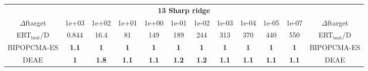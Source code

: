 \begin{tabular}{cccccccccccc}
 & \multicolumn{10}{c}{{\normalsize \textbf{13 Sharp ridge}}}\\
$\Delta$ftarget& 1e+03& 1e+02& 1e+01& 1e+00& 1e-01& 1e-02& 1e-03& 1e-04& 1e-05& 1e-07 & $\Delta$ftarget \\
ERT$_{\textrm{best}}$/D& 0.844& 16.4& 81& 149& 189& 244& 313& 370& 440& 550 & ERT$_{\textrm{best}}$/D \\
\hline
BIPOPCMA-ES & \textbf{1.1} & \textbf{1} & \textbf{1} & \textbf{1} & \textbf{1} & \textbf{1} & \textbf{1} & \textbf{1} & \textbf{1} & \textbf{1} & BIPOPCMA-ES \cite{add_an_entry_for_BIPOPCMA-ES_in_bbob.bib}\\
DEAE & \textbf{1} & \textbf{1.8} & \textbf{1.1} & \textbf{1.1} & \textbf{1.2} & \textbf{1.2} & \textbf{1.1} & \textbf{1.1} & \textbf{1.1} & \textbf{1.1} & DEAE \cite{add_an_entry_for_DEAE_in_bbob.bib}
\end{tabular}
